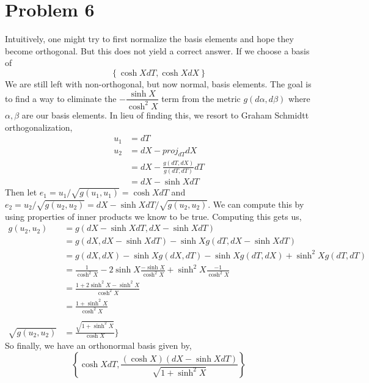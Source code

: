 \documentclass{article}
\theoremstyle{definition}
\begin{document}
\section*{Problem 6}
Intuitively, one might try to first normalize the basis elements and hope they become orthogonal. But 
this does not yield a correct answer. If we choose a basis of 
\[
    \left\{\cosh X dT, \cosh XdX\right\}   
\]
We are still left with non-orthogonal, but now normal, basis elements. The goal is to find a way to eliminate the 
$-\dfrac{\sinh X}{\cosh^2X}$ term from the metric $g(d\alpha, d\beta)$ where $\alpha,\beta$ are our basis elements.
In lieu of finding this, we resort to Graham Schmidtt orthogonalization,
\begin{align*}
    u_1 &= dT \\
    u_2 &= dX - proj_{dT}dX \\
    &= dX - \frac{g(dT,dX)}{g(dT,dT)}dT \\
    &= dX - \sinh X dT
\end{align*}
Then let $e_1 = u_1 /\sqrt{g(u_1,u_1)}  = \cosh X dT$ and $e_2 = u_2 / \sqrt{g(u_2,u_2)} = dX - \sinh X dT / \sqrt{g(u_2, u_2)}$.
We can compute this by using properties of inner products we know to be true. Computing this gets us,
\begin{align*}
    g(u_2, u_2) &= g(dX - \sinh X dT, dX - \sinh X dT) \\
    &= g(dX, dX - \sinh X dT) - \sinh X g(dT, dX - \sinh X dT) \\
    &= g(dX, dX) - \sinh X g(dX, dT) - \sinh Xg(dT, dX) + \sinh^2X g(dT,dT) \\
    &= \frac{1}{\cosh^2 X} - 2\sinh X \frac{-\sinh X}{\cosh^2 X} + \sinh^2 X \frac{-1}{\cosh^2 X} \\
    &= \frac{1 + 2 \sinh^2 X - \sinh^2 X}{\cosh^2 X} \\
    &= \frac{1 + \sinh^2 X}{\cosh^2 X}\\\\
    \sqrt{g(u_2, u_2)} &= \frac{\sqrt{1 + \sinh^2 X}}{\cosh X}\}
\end{align*}
So finally, we have an orthonormal basis given by,
\[
    \left\{\cosh X dT, \frac{(\cosh X)(dX - \sinh X dT)}{\sqrt{1 + \sinh^2 X}}\right\}    
\]
\end{document}
